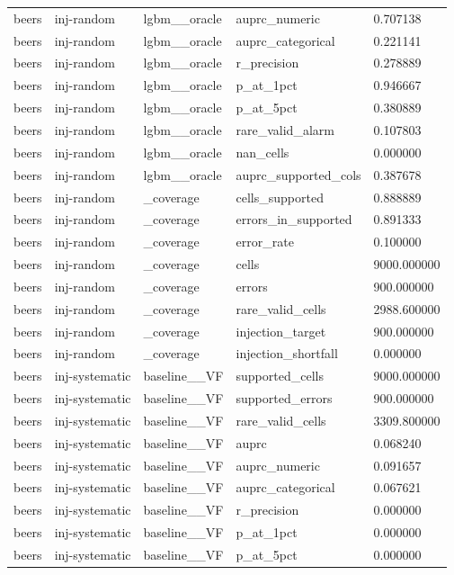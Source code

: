 \begin{tabular}{lllll}
beers & inj-random & lgbm\_\_oracle & auprc\_numeric & 0.707138 \\
beers & inj-random & lgbm\_\_oracle & auprc\_categorical & 0.221141 \\
beers & inj-random & lgbm\_\_oracle & r\_precision & 0.278889 \\
beers & inj-random & lgbm\_\_oracle & p\_at\_1pct & 0.946667 \\
beers & inj-random & lgbm\_\_oracle & p\_at\_5pct & 0.380889 \\
beers & inj-random & lgbm\_\_oracle & rare\_valid\_alarm & 0.107803 \\
beers & inj-random & lgbm\_\_oracle & nan\_cells & 0.000000 \\
beers & inj-random & lgbm\_\_oracle & auprc\_supported\_cols & 0.387678 \\
beers & inj-random & \_coverage & cells\_supported & 0.888889 \\
beers & inj-random & \_coverage & errors\_in\_supported & 0.891333 \\
beers & inj-random & \_coverage & error\_rate & 0.100000 \\
beers & inj-random & \_coverage & cells & 9000.000000 \\
beers & inj-random & \_coverage & errors & 900.000000 \\
beers & inj-random & \_coverage & rare\_valid\_cells & 2988.600000 \\
beers & inj-random & \_coverage & injection\_target & 900.000000 \\
beers & inj-random & \_coverage & injection\_shortfall & 0.000000 \\
beers & inj-systematic & baseline\_\_VF & supported\_cells & 9000.000000 \\
beers & inj-systematic & baseline\_\_VF & supported\_errors & 900.000000 \\
beers & inj-systematic & baseline\_\_VF & rare\_valid\_cells & 3309.800000 \\
beers & inj-systematic & baseline\_\_VF & auprc & 0.068240 \\
beers & inj-systematic & baseline\_\_VF & auprc\_numeric & 0.091657 \\
beers & inj-systematic & baseline\_\_VF & auprc\_categorical & 0.067621 \\
beers & inj-systematic & baseline\_\_VF & r\_precision & 0.000000 \\
beers & inj-systematic & baseline\_\_VF & p\_at\_1pct & 0.000000 \\
beers & inj-systematic & baseline\_\_VF & p\_at\_5pct & 0.000000 \\

\end{tabular}
